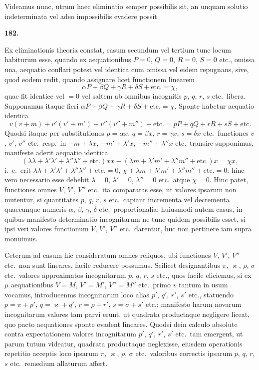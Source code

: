 \documentclass[11pt,a4paper]{article}
\begin{document}
Videamus nunc, utrum haec eliminatio semper possibilis sit, an unquam solutio indeterminata vel adeo impossibilis evadere possit.

\newpage
\setcounter{page}{254}

\noindent\textbf{182.}

Ex eliminationis theoria constat, casum secundum vel tertium tunc locum habiturum esse, quando ex aequationibus $P=0$, $Q=0$, $R=0$, $S=0$ etc., omissa una, aequatio conflari potest vel identica cum omissa vel eidem repugnans, sive, quod eodem redit, quando assignare licet functionem linearem
\[
\alpha P + \beta Q + \gamma R + \delta S + \text{etc.} = \chi,
\]
quae fit identice vel $=0$ vel saltem ab omnibus incognitis $p$, $q$, $r$, $s$ etc.\ libera. Supponamus itaque fieri $\alpha P + \beta Q + \gamma R + \delta S + \text{etc.} = \chi$. Sponte habetur aequatio identica
\[
v(v+m) + v'(v'+m') + v''(v''+m'') + \text{etc.} = pP + qQ + rR + sS + \text{etc.}
\]
Quodsi itaque per substitutiones $p = \alpha x$, $q = \beta x$, $r = \gamma x$, $s = \delta x$ etc.\ functiones $v$, $v'$, $v''$ etc.\ resp.\ in $-m + \lambda x$, $-m' + \lambda' x$, $-m'' + \lambda'' x$ etc.\ transire supponimus, manifeste aderit aequatio identica
\[
(\lambda\lambda + \lambda'\lambda' + \lambda''\lambda'' + \text{etc.})xx - (\lambda m + \lambda'm' + \lambda''m'' + \text{etc.})x = \chi x,
\]
i.~e.\ erit $\lambda\lambda + \lambda'\lambda' + \lambda''\lambda'' + \text{etc.} = 0$, $\chi + \lambda m + \lambda'm' + \lambda''m'' + \text{etc.} = 0$: hinc vero necessario esse debebit $\lambda = 0$, $\lambda' = 0$, $\lambda'' = 0$ etc.\ atque $\chi = 0$. Hinc patet, functiones omnes $V$, $V'$, $V''$ etc.\ ita comparatas esse, ut valores ipsarum non mutentur, si quantitates $p$, $q$, $r$, $s$ etc.\ capiant incrementa vel decrementa quaecunque numeris $\alpha$, $\beta$, $\gamma$, $\delta$ etc.\ proportionalia: huiusmodi autem casus, in quibus manifesto determinatio incognitarum ne tunc quidem possibilis esset, si ipsi veri valores functionum $V$, $V'$, $V''$ etc.\ darentur, huc non pertinere iam supra monuimus.

Ceterum ad casum hic consideratum omnes reliquos, ubi functiones $V$, $V'$, $V''$ etc.\ non sunt lineares, facile reducere possumus. Scilicet designantibus $\pi$, $\varkappa$, $\rho$, $\sigma$ etc.\ valores approximatos incognitarum $p$, $q$, $r$, $s$ etc., quos facile eliciemus, si ex $\mu$ aequationibus $V=M$, $V'=M'$, $V''=M''$ etc.\ primo $v$ tantum in usum vocamus, introducenms incognitarum loco alias $p'$, $q'$, $r'$, $s'$ etc., statuendo $p = \pi + p'$, $q = \varkappa + q'$, $r = \rho + r'$, $s = \sigma + s'$ etc.: manifesto harum novarum incognitarum valores tam parvi erunt, ut quadrata productaque negligere liceat, quo pacto aequationes sponte evadent lineares. Quodsi dein calculo absolute contra expectationem valores incognitarum $p'$, $q'$, $r'$, $s'$ etc.\ tam emergent, ut parum tutum videatur, quadrata productaque neglexisse, eiusdem operationis repetitio acceptis loco ipsarum $\pi$, $\varkappa$, $\rho$, $\sigma$ etc.\ valoribus correctis ipsarum $p$, $q$, $r$, $s$ etc.\ remedium allaturum affert.
\end{document}
